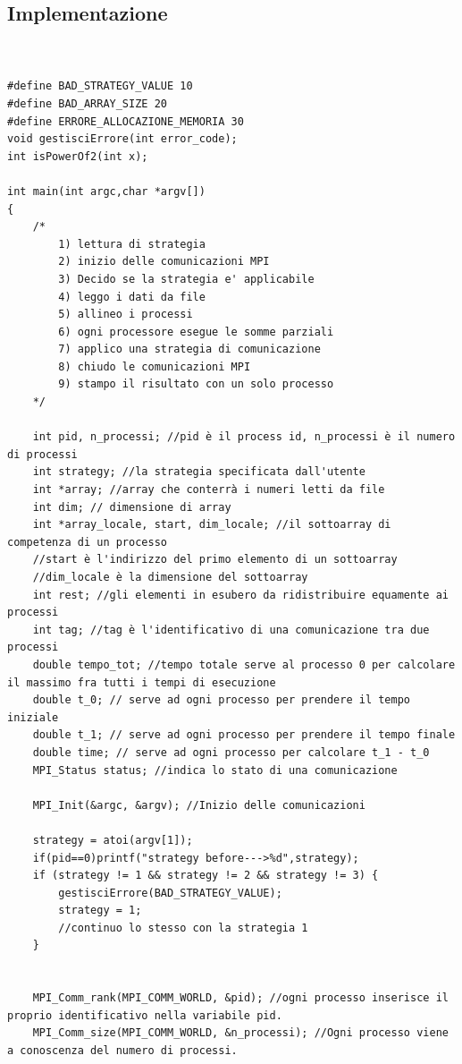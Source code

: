 \documentclass{article}
\begin{document}
\subsection{Implementazione}
\begin{lstlisting}


#define BAD_STRATEGY_VALUE 10
#define BAD_ARRAY_SIZE 20
#define ERRORE_ALLOCAZIONE_MEMORIA 30
void gestisciErrore(int error_code);
int isPowerOf2(int x);

int main(int argc,char *argv[])
{    
    /*
        1) lettura di strategia
        2) inizio delle comunicazioni MPI
        3) Decido se la strategia e' applicabile
        4) leggo i dati da file
        5) allineo i processi
        6) ogni processore esegue le somme parziali
        7) applico una strategia di comunicazione
        8) chiudo le comunicazioni MPI
        9) stampo il risultato con un solo processo
    */

    int pid, n_processi; //pid è il process id, n_processi è il numero di processi
    int strategy; //la strategia specificata dall'utente
    int *array; //array che conterrà i numeri letti da file
    int dim; // dimensione di array
    int *array_locale, start, dim_locale; //il sottoarray di competenza di un processo
    //start è l'indirizzo del primo elemento di un sottoarray
    //dim_locale è la dimensione del sottoarray
    int rest; //gli elementi in esubero da ridistribuire equamente ai processi
    int tag; //tag è l'identificativo di una comunicazione tra due processi
    double tempo_tot; //tempo totale serve al processo 0 per calcolare il massimo fra tutti i tempi di esecuzione
    double t_0; // serve ad ogni processo per prendere il tempo iniziale
    double t_1; // serve ad ogni processo per prendere il tempo finale
    double time; // serve ad ogni processo per calcolare t_1 - t_0
    MPI_Status status; //indica lo stato di una comunicazione

    MPI_Init(&argc, &argv); //Inizio delle comunicazioni

    strategy = atoi(argv[1]);
    if(pid==0)printf("strategy before--->%d",strategy);
    if (strategy != 1 && strategy != 2 && strategy != 3) {
        gestisciErrore(BAD_STRATEGY_VALUE);
        strategy = 1;
        //continuo lo stesso con la strategia 1
    }


    MPI_Comm_rank(MPI_COMM_WORLD, &pid); //ogni processo inserisce il proprio identificativo nella variabile pid. 
    MPI_Comm_size(MPI_COMM_WORLD, &n_processi); //Ogni processo viene a conoscenza del numero di processi.


\end{lstlisting}
\end{document}
